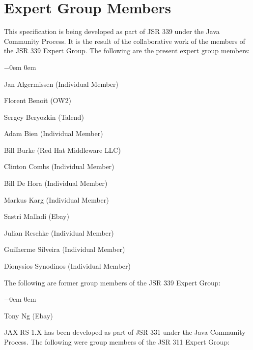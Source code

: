 \section{Expert Group Members} 
\label{expert_group}

This specification is being developed as part of JSR 339 under the Java Community Process. It is the result of the collaborative work of the members of the JSR 339 Expert Group. The following are the present expert group members:

\begin{list}{$-$}{\parsep 0em  0em}
\item Jan Algermissen (Individual Member)
\item Florent Benoit (OW2)
\item Sergey Beryozkin (Talend) 
\item Adam Bien (Individual Member) 
\item Bill Burke (Red Hat Middleware LLC) 
\item Clinton Combs (Individual Member) 
\item Bill De Hora (Individual Member)  
\item Markus Karg (Individual Member) 
\item Sastri Malladi (Ebay) 
\item Julian Reschke (Individual Member)
\item Guilherme Silveira (Individual Member) 
\item Dionysios Synodinos (Individual Member)
\end{list}

The following are former group members of the JSR 339 Expert Group:

\begin{list}{$-$}{\parsep 0em  0em}
\item Tony Ng (Ebay)
\end{list}

JAX-RS 1.X has been developed as part of JSR 331 under the Java Community Process. The following were group members of the JSR 311 Expert Group:

